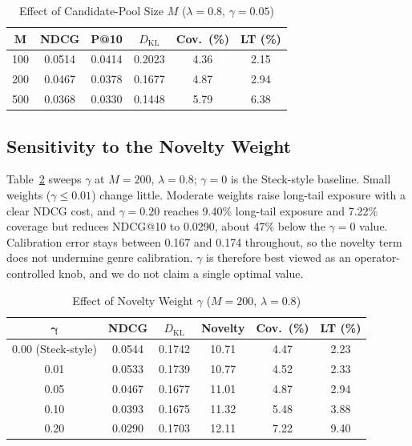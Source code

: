 \documentclass[conference]{IEEEtran}
\newcommand{\KL}{D_{\mathrm{KL}}}
\begin{document}
  \begin{table}[t]
  \centering
  \caption{Effect of Candidate-Pool Size $M$ ($\lambda=0.8$, $\gamma=0.05$)}
  \label{tab:pool}
  \renewcommand{\arraystretch}{1.1}
  \footnotesize
  \begin{tabular}{@{}cccccc@{}}
  \toprule
  $\boldsymbol M$ & \textbf{NDCG} & \textbf{P@10} & \textbf{$\KL$} & \textbf{Cov.\ (\%)} & \textbf{LT (\%)}\\
  \midrule
  100 & 0.0514 & 0.0414 & 0.2023 & 4.36 & 2.15\\
  200 & 0.0467 & 0.0378 & 0.1677 & 4.87 & 2.94\\
  500 & 0.0368 & 0.0330 & 0.1448 & 5.79 & 6.38\\
  \bottomrule
  \end{tabular}
  \end{table}

  \subsection{Sensitivity to the Novelty Weight}
  Table~\ref{tab:gamma} sweeps $\gamma$ at $M=200$, $\lambda=0.8$; $\gamma=0$ is the Steck-style baseline. Small weights ($\gamma\le0.01$) change little. Moderate weights raise long-tail exposure with a clear NDCG cost, and $\gamma=0.20$ reaches 9.40\% long-tail exposure and 7.22\% coverage but reduces NDCG@10 to 0.0290, about 47\% below the $\gamma=0$ value. Calibration error stays between 0.167 and 0.174 throughout, so the novelty term does not undermine genre calibration. $\gamma$ is therefore best viewed as an operator-controlled knob, and we do not claim a single optimal value.

  \begin{table}[t]
  \centering
  \caption{Effect of Novelty Weight $\gamma$ ($M=200$, $\lambda=0.8$)}
  \label{tab:gamma}
  \renewcommand{\arraystretch}{1.1}
  \footnotesize
  \begin{tabular}{@{}cccccc@{}}
  \toprule
  $\boldsymbol\gamma$ & \textbf{NDCG} & \textbf{$\KL$} & \textbf{Novelty} & \textbf{Cov.\ (\%)} & \textbf{LT (\%)}\\
  \midrule
  0.00 (Steck-style) & 0.0544 & 0.1742 & 10.71 & 4.47 & 2.23\\
  0.01 & 0.0533 & 0.1739 & 10.77 & 4.52 & 2.33\\
  0.05 & 0.0467 & 0.1677 & 11.01 & 4.87 & 2.94\\
  0.10 & 0.0393 & 0.1675 & 11.32 & 5.48 & 3.88\\
  0.20 & 0.0290 & 0.1703 & 12.11 & 7.22 & 9.40\\
  \bottomrule
  \end{tabular}
  \end{table}
\end{document}
